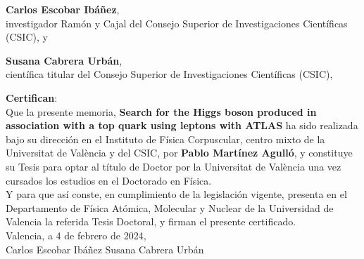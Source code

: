 \begin{titlepage}
\cleardoublepage
\thispagestyle{empty}

\thispagestyle{empty}

\vspace*{3cm}

\noindent \textbf{Carlos Escobar Ibáñez},\\
investigador Ramón y Cajal del Consejo Superior de Investigaciones Cient\'ificas (CSIC), y \vspace{0.2cm}

\noindent \textbf{Susana Cabrera Urbán},\\
cient\'ifica titular del Consejo Superior de Investigaciones Cient\'ificas (CSIC), \vspace{0.2cm}

\noindent \textbf{Certifican}:\\[2ex]
%
\noindent Que la presente memoria, 
\textbf{Search for the Higgs boson produced in association with a top quark using \Ptau leptons with ATLAS}
ha sido realizada bajo su direcci{\'o}n en el Instituto de F{\'i}sica Corpuscular, centro mixto de la Universitat de València y del CSIC, por \textbf{Pablo Martínez Agulló}, y constituye su Tesis para optar al título de Doctor por la Universitat de València una vez cursados los estudios en el Doctorado en Física.\\[2ex]




%
\noindent Y para que as\'i conste, en cumplimiento de la legislaci\'on vigente, presenta en el Departamento de F\'isica At\'omica, Molecular y Nuclear de la Universidad de Valencia la referida Tesis Doctoral, y firman el presente certificado.\\[4ex]

\noindent Valencia, a 4 de febrero de 2024,\\[12ex]

\noindent \hspace{2cm} Carlos Escobar Ib\'añez \hspace{2cm} Susana Cabrera Urb\'an


\newpage
\thispagestyle{empty}
$$ $$
\newpage
\thispagestyle{empty}
\end{titlepage}
